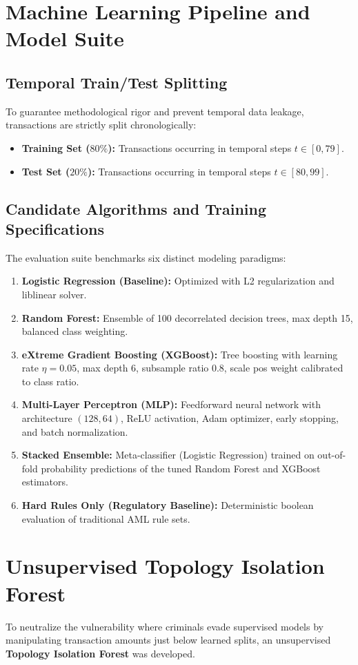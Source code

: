 \section{Machine Learning Pipeline and Model Suite}
\subsection{Temporal Train/Test Splitting}
To guarantee methodological rigor and prevent temporal data leakage, transactions are strictly split chronologically:
\begin{itemize}
    \item \textbf{Training Set ($80\%$):} Transactions occurring in temporal steps $t \in [0, 79]$.
    \item \textbf{Test Set ($20\%$):} Transactions occurring in temporal steps $t \in [80, 99]$.
\end{itemize}

\subsection{Candidate Algorithms and Training Specifications}
The evaluation suite benchmarks six distinct modeling paradigms:
\begin{enumerate}
    \item \textbf{Logistic Regression (Baseline):} Optimized with L2 regularization and liblinear solver.
    \item \textbf{Random Forest:} Ensemble of 100 decorrelated decision trees, max depth 15, balanced class weighting.
    \item \textbf{eXtreme Gradient Boosting (XGBoost):} Tree boosting with learning rate $\eta = 0.05$, max depth 6, subsample ratio 0.8, scale pos weight calibrated to class ratio.
    \item \textbf{Multi-Layer Perceptron (MLP):} Feedforward neural network with architecture $(128, 64)$, ReLU activation, Adam optimizer, early stopping, and batch normalization.
    \item \textbf{Stacked Ensemble:} Meta-classifier (Logistic Regression) trained on out-of-fold probability predictions of the tuned Random Forest and XGBoost estimators.
    \item \textbf{Hard Rules Only (Regulatory Baseline):} Deterministic boolean evaluation of traditional AML rule sets.
\end{enumerate}

\section{Unsupervised Topology Isolation Forest}
To neutralize the vulnerability where criminals evade supervised models by manipulating transaction amounts just below learned splits, an unsupervised \textbf{Topology Isolation Forest} was developed.

